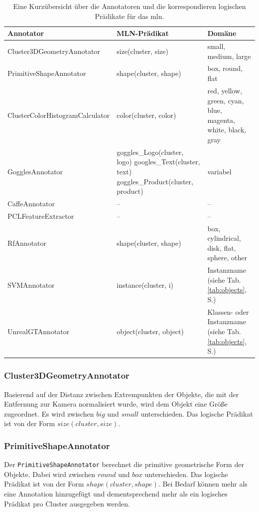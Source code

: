 \begin{table}
\begin{tabularx}{\textwidth}{lXX}
\textbf{Annotator}				& \textbf{MLN-Prädikat}	& \textbf{Domäne}	\\ \hline 
Cluster3DGeometryAnnotator		& size(cluster, size)	& small, medium, large	\\ 
PrimitiveShapeAnnotator			& shape(cluster, shape)	& box, round, flat 	\\ 
ClusterColorHistogramCalculator  & color(cluster, color)	& red, yellow, green, cyan, blue, magenta, white, black, gray \\ 
GogglesAnnotator				& goggles\_Logo(cluster, logo) \newline googles\_Text(cluster, text)  \newline goggles\_Product(cluster, product)	& 	variabel	\\ 
CaffeAnnotator					& --					& --	\\
PCLFeatureExtractor				& --					& --	\\ 
RfAnnotator						& shape(cluster, shape)	&	box, cylindrical, disk, flat, sphere, other	\\
SVMAnnotator					& instance(cluster, i)	& Instanzname (siehe Tab.\ref{tab:objects}, S.\pageref{tab:objects}) \\
UnrealGTAnnotator				& object(cluster, object)	& Klassen- oder Instanzname (siehe Tab.\ref{tab:objects}, S.\pageref{tab:objects})	\\ \hline 
\end{tabularx}
\caption[Kurzübersicht der Annotatoren]{Eine Kurzübersicht über die Annotatoren und die korrespondieren logischen Prädikate für das \gls{mln}.}
\label{tab:annotators}
\end{table}

\subsubsection{Cluster3DGeometryAnnotator}
Basierend auf der Distanz zwischen Extrempunkten der Objekte, die mit der Entfernung zur Kamera normalisiert wurde, wird dem Objekt eine Größe zugeordnet. Es wird zwischen $big$ und $small$ unterschieden. Das logische Prädikat ist von der Form $size(cluster,  size)$. 

\subsubsection{PrimitiveShapeAnnotator} 
Der \texttt{PrimitiveShapeAnnotator} berechnet die primitive geometrische Form der Objekte.  Dabei wird zwischen $round$ und $box$ unterschieden. Das logische Prädikat ist von der Form $shape(cluster,  shape)$. Bei Bedarf können mehr als eine Annotation hinzugefügt und dementsprechend mehr als ein logisches Prädikat pro Cluster ausgegeben werden.
   
